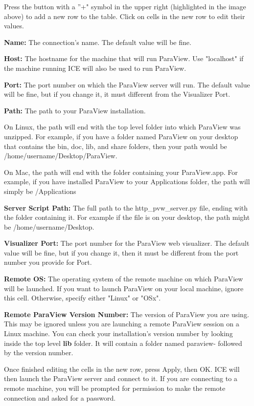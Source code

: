 Press the button with a ''+" symbol in the upper right (highlighted in the image
above) to add a new row to the table. Click on cells in the new row to edit
their values. 

\textbf{Name:} The connection's name. The default value will be fine.

\textbf{Host:} The hostname for the machine that will run ParaView. Use "localhost" if the machine running ICE will also be used to run ParaView.

\textbf{Port:} The port number on which the ParaView server will run. The default value will be fine, but if you change it, it must different from the Visualizer Port.

\textbf{Path:} The path to your ParaView installation. 

On Linux, the path will end with the top level folder into which ParaView was unzipped. For example, if you have a folder named ParaView on your desktop that contains the bin, doc, lib, and share folders, then your path would be /home/username/Desktop/ParaView. 

On Mac, the path will end with the folder containing your ParaView.app. For example, if you have installed ParaView to your Applications folder, the path will simply be /Applications

\textbf{Server Script Path:} The full path to the http_pvw_server.py file, ending with the folder containing it. For example if the file is on your desktop, the path might be /home/username/Desktop.

\textbf{Visualizer Port:} The port number for the ParaView web visualizer. The default value will be fine, but if you change it, then it must be different from the port number you provide for Port.

\textbf{Remote OS:} The operating system of the remote machine on which ParaView will be launched. If you want to launch ParaView on your local machine, ignore this cell. Otherwise, specify either "Linux" or "OSx".

\textbf{Remote ParaView Version Number:} The version of ParaView you are using. This may be ignored unless you are launching a remote ParaView session on a Linux machine. You can check your installation's version number by looking inside the top level \textbf{lib} folder. It will contain a folder named paraview- followed by the version number.

Once finished editing the cells in the new row, press Apply, then OK. ICE will
then launch the ParaView server and connect to it. If you are connecting to a remote machine, you will be prompted for permission to make the remote connection and asked for a password.

